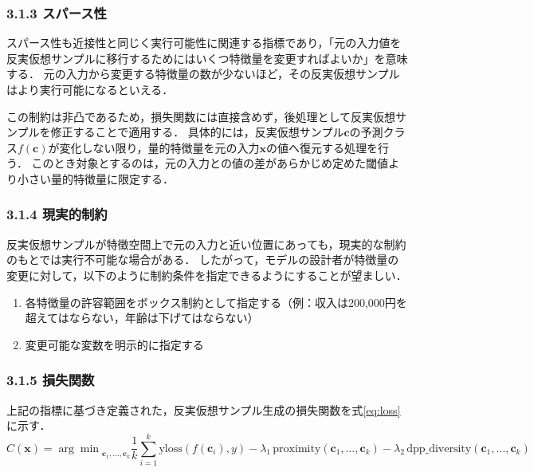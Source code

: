 \documentclass[dvipdfmx]{jreport}
\begin{document}
\subsubsection{3.1.3 スパース性} \label{sec:sparsity}
スパース性も近接性と同じく実行可能性に関連する指標であり，「元の入力値を反実仮想サンプルに移行するためにはいくつ特徴量を変更すればよいか」を意味する．
元の入力から変更する特徴量の数が少ないほど，その反実仮想サンプルはより実行可能になるといえる．

この制約は非凸であるため，損失関数には直接含めず，後処理として反実仮想サンプルを修正することで適用する．
具体的には，反実仮想サンプル$\bm{c}$の予測クラス$f(\bm{c})$が変化しない限り，量的特徴量を元の入力$\bm{x}$の値へ復元する処理を行う．
このとき対象とするのは，元の入力との値の差があらかじめ定めた閾値より小さい量的特徴量に限定する．

\subsubsection{3.1.4 現実的制約} \label{sec:realistic_constraints}
反実仮想サンプルが特徴空間上で元の入力と近い位置にあっても，現実的な制約のもとでは実行不可能な場合がある．
したがって，モデルの設計者が特徴量の変更に対して，以下のように制約条件を指定できるようにすることが望ましい．
\begin{tcolorbox}[title=\textbf{現実的制約の種類}]
    \begin{enumerate}
        \item 各特徴量の許容範囲をボックス制約として指定する（例：収入は200,000円を超えてはならない，年齢は下げてはならない）
        \item 変更可能な変数を明示的に指定する
    \end{enumerate}
\end{tcolorbox}

\subsubsection{3.1.5 損失関数}
上記の指標に基づき定義された，反実仮想サンプル生成の損失関数を式\eqref{eq:loss}に示す．
\begin{equation}
C(\bm{x}) = {\arg\min}_{\bm{c}_1,\ldots,\bm{c}_k} 
\frac{1}{k} \sum_{i=1}^{k} \text{yloss}(f(\bm{c}_i), y)
- \lambda_1 \, \text{proximity}(\bm{c}_1, \ldots, \bm{c}_k)
- \lambda_2 \, \text{dpp\_diversity}(\bm{c}_1, \ldots, \bm{c}_k) \label{eq:loss}
\end{equation}
\end{document}
